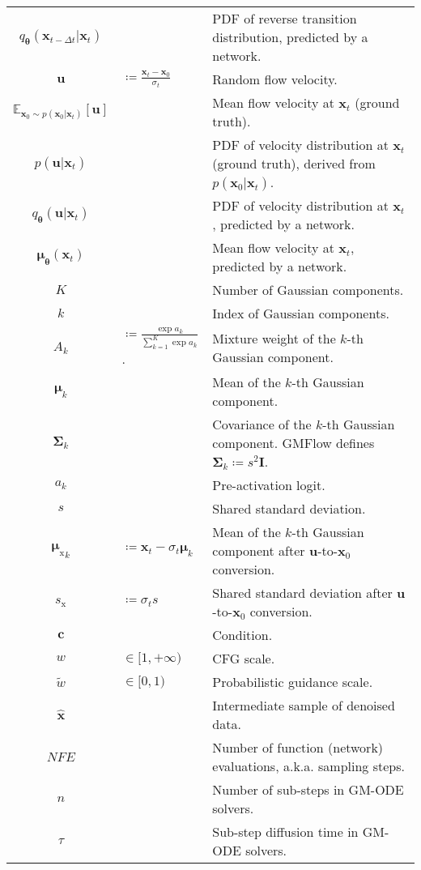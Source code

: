 \documentclass{article}
\def\vmu{{\bm{\mu}}}
\def\vtheta{{\bm{\theta}}}
\def\vc{{\bm{c}}}
\def\vu{{\bm{u}}}
\def\vx{{\bm{x}}}
\def\mI{{\bm{I}}}
\def\mSigma{{\bm{\Sigma}}}
\newcommand{\E}{\mathbb{E}}
\theoremstyle{custom}
\theoremstyle{definition}
\theoremstyle{remark}
\begin{document}
\begin{table}[h]
\begin{center}
{\begin{tabular}{cll}
        $q_\vtheta(\vx_{t-\Delta t}|\vx_t)$ & & PDF of reverse transition distribution, predicted by a network.  \\
        $\vu$ & $\coloneqq \frac{\vx_t - \vx_0 }{\sigma_t}$ & Random flow velocity. \\
        $\E_{\vx_0 \sim p(\vx_0 | \vx_t)} [\vu]$ & & Mean flow velocity at $\vx_t$ (ground truth). \\
        $p(\vu|\vx_t)$ & & PDF of velocity distribution at $\vx_t$ (ground truth), derived from $p(\vx_0|\vx_t)$. \\
        $q_\vtheta(\vu|\vx_t)$ & & PDF of velocity distribution at $\vx_t$, predicted by a network. \\
        $\vmu_{\vtheta}(\vx_t)$ & & Mean flow velocity at $\vx_t$, predicted by a network. \\
        $K$ & & Number of Gaussian components. \\
        $k$ & & Index of Gaussian components. \\
        $A_k$ & $\coloneqq \frac{\exp a_k}{\sum_{k=1}^K \exp a_k}$. & Mixture weight of the $k$-th Gaussian component. \\
        $\vmu_k$ & & Mean of the $k$-th Gaussian component. \\
        $\mSigma_k$ & & Covariance of the $k$-th Gaussian component. GMFlow defines $\mSigma_k \coloneqq s^2\mI$. \\
        $a_k$ & & Pre-activation logit. \\
        $s$ & & Shared standard deviation. \\
        ${\vmu_\text{x}}_k$ & $\coloneqq \vx_t - \sigma_t \vmu_k$ & Mean of the $k$-th Gaussian component after $\vu$-to-$\vx_0$ conversion. \\
        $s_\text{x}$ & $\coloneqq \sigma_t s$ & Shared standard deviation after $\vu$-to-$\vx_0$ conversion. \\
        $\vc$ & & Condition. \\
        $w$ & $\in [1, +\infty)$ & CFG scale. \\
        $\tilde{w}$ & $\in [0, 1)$ & Probabilistic guidance scale. \\
        $\hat{\vx}$ & & Intermediate sample of denoised data. \\
        $\mathit{NFE}$ & & Number of function (network) evaluations, a.k.a. sampling steps. \\
        $n$ & & Number of sub-steps in GM-ODE solvers. \\
        $\tau$ & & Sub-step diffusion time in GM-ODE solvers. \\

\end{tabular}}
\end{center}
\end{table}
\end{document}
